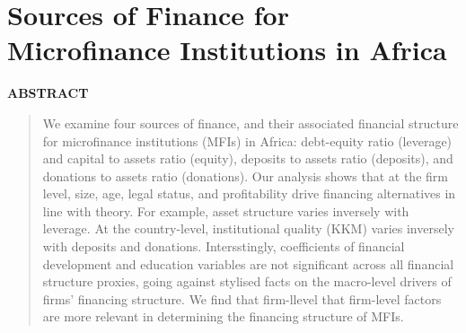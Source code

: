 \documentclass[a4paper,nobind]{templates/ociamthesis}
\begin{document}
\setlength{\textbaselineskip}{22pt plus2pt}

\setlength{\parskip}{2pt plus 1pt}

\setlength{\baselineskip}{\textbaselineskip}

\hypertarget{Introduction}{%
\chapter{Sources of Finance for Microfinance Institutions in Africa}\label{Introduction}}

\minitoc 
{}

\textbf{ABSTRACT}

\begin{quote}
We examine four sources of finance, and their associated financial structure for microfinance institutions (MFIs) in Africa: debt-equity ratio (leverage) and capital to assets ratio (equity), deposits to assets ratio (deposits), and donations to assets ratio (donations). Our analysis shows that at the firm level, size, age, legal status, and profitability drive financing alternatives in line with theory. For example, asset structure varies inversely with leverage. At the country-level, institutional quality (KKM) varies inversely with deposits and donations. Intersstingly, coefficients of financial development and education variables are not significant across all financial structure proxies, going against stylised facts on the macro-level drivers of firms' financing structure. We find that firm-llevel that firm-level factors are more relevant in determining the financing structure of MFIs.
\end{quote}

\newpage
\end{document}
